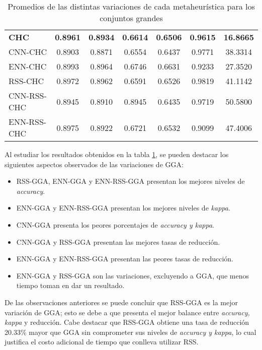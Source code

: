 \begin{table}[h!]
\begin{tabular}{l c c c c c c}
\hline

\textbf{CHC}  & \textbf{0.8961} & \textbf{0.8934} & \textbf{0.6614} & \textbf{0.6506} & \textbf{0.9615} & \textbf{16.8665} \\
CNN-CHC & 0.8903 & 0.8871 & 0.6554 & 0.6437 & 0.9771 & 38.3314 \\
ENN-CHC & 0.8993 & 0.8964 & 0.6746 & 0.6631 & 0.9233 & 27.3520 \\
RSS-CHC & 0.8972 & 0.8962 & 0.6591 & 0.6526 & 0.9819 & 41.1142 \\
CNN-RSS-CHC & 0.8945 & 0.8910 & 0.8945 & 0.6435 & 0.9719 & 50.5800 \\
ENN-RSS-CHC & 0.8975 & 0.8922 & 0.6721 & 0.6532 & 0.9099 & 47.4006 \\

\hline
\end{tabular}
\caption{Promedios de las distintas variaciones de cada metaheurística para los conjuntos grandes}
\label{grande-all}
\end{table}

Al estudiar los resultados obtenidos en la tabla \ref{grande-all}, se pueden destacar los siguientes aspectos observados de las variaciones de GGA:

\begin{itemize}

\item RSS-GGA, ENN-GGA y ENN-RSS-GGA presentan los mejores niveles de \emph{accuracy}. 

\item ENN-GGA y ENN-RSS-GGA presentan los mejores niveles de \emph{kappa}.

\item CNN-GGA presenta los peores porcentajes de \emph{accuracy y kappa}. 

\item CNN-GGA y RSS-GGA presentan las mejores tasas de reducción.

\item ENN-GGA y ENN-RSS-GGA presentan las peores tasas de reducción.

\item ENN-GGA y RSS-GGA son las variaciones, excluyendo a GGA, que menos tiempo toman en dar un resultado.

\end{itemize}

De las observaciones anteriores se puede concluir que RSS-GGA es la mejor variación de GGA; esto se debe a que presenta el mejor balance entre \emph{accuracy, kappa} y reducción. Cabe destacar que RSS-GGA obtiene una tasa de reducción 20.33\% mayor que GGA sin comprometer sus niveles de \emph{accuracy y kappa}, lo cual justifica el costo adicional de tiempo que conlleva utilizar RSS.

